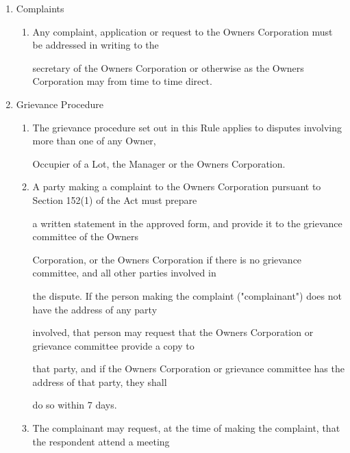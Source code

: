 \documentclass{article}
\begin{document}
\begin{enumerate}[label=\arabic*.]
\begin{enumerate}[label=\arabic{enumi}.\arabic*.]
\item {\fontsize{9.99}{1} Complaints }

\begin{enumerate}[label=(\arabic*)]
\item {\fontsize{9.962}{1} Any complaint, application or request to the Owners Corporation must be addressed in writing to the }

{\fontsize{10.02}{1}secretary of the Owners Corporation or otherwise as the Owners Corporation may from time to time direct. }

\end{enumerate}
\item {\fontsize{9.99}{1} Grievance Procedure }

\begin{enumerate}[label=(\arabic*)]
\item {\fontsize{9.962}{1} The grievance procedure set out in this Rule applies to disputes involving more than one of any Owner, }

{\fontsize{10.02}{1}Occupier of a Lot, the Manager or the Owners Corporation. }

\item {\fontsize{9.962}{1} A party making a complaint to the Owners Corporation pursuant to Section 152(1) of the Act must prepare }

{\fontsize{10.02}{1}a written statement in the approved form, and provide it to the grievance committee of the Owners }

{\fontsize{10.02}{1}Corporation, or the Owners Corporation if there is no grievance committee, and all other parties involved in }

{\fontsize{10.02}{1}the dispute. If the person making the complaint ("complainant") does not have the address of any party }

\newpage

{\fontsize{10.02}{1}involved, that person may request that the Owners Corporation or grievance committee provide a copy to }

{\fontsize{10.02}{1}that party, and if the Owners Corporation or grievance committee has the address of that party, they shall }

{\fontsize{10.02}{1}do so within 7 days. }

\item {\fontsize{9.962}{1} The complainant may request, at the time of making the complaint, that the respondent attend a meeting }


\end{enumerate}
\end{enumerate}
\end{enumerate}
\end{document}
